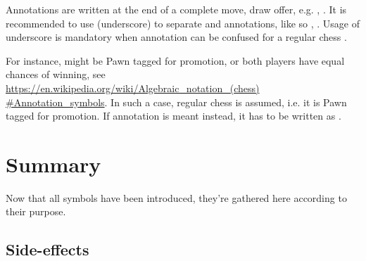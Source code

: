Annotations are written at the end of a complete move, draw offer, e.g. ,
. It is recommended to use \alg{\_} (underscore) to separate 
and annotations, like so , . Usage of underscore is
mandatory when annotation can be confused for a regular chess .

For instance,  might be Pawn tagged for promotion, or both players have equal
chances of winning, see\\
\href{https://en.wikipedia.org/wiki/Algebraic\_notation\_(chess)#Annotation\_symbols}
{https://en.wikipedia.org/wiki/Algebraic\_notation\_(chess)\\
\#Annotation\_symbols}. In such a case, regular chess  is assumed, i.e. it
is Pawn tagged for promotion. If annotation is meant instead, it has to be written as
.

\clearpage %

\section*{Summary}
\label{sec:Appendix/Summary}

Now that all symbols have been introduced, they're gathered here according to their purpose.

\subsection*{Side-effects}
\label{sec:Appendix/Summary/Side-effects}

